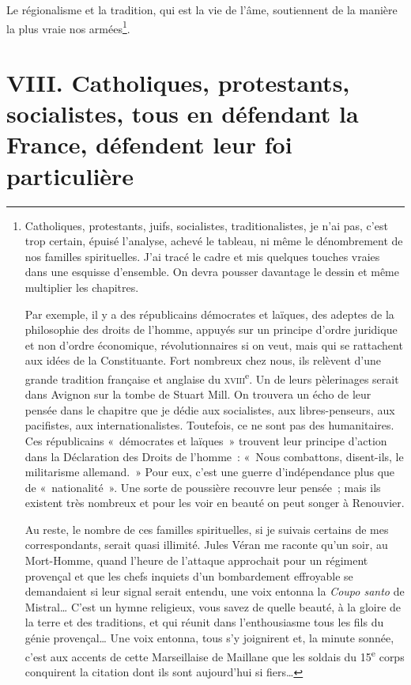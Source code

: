 \documentclass[french,twoside]{book} %
\newcommand\chapteropen{} %
\newcommand\chapterclose{} %
\begin{document}
Le régionalisme et la tradition, qui est la vie de l’âme, soutiennent de la manière la plus vraie nos armées\footnote{\noindent Catholiques, protestants, juifs, socialistes, traditionalistes, je n’ai pas, c’est trop certain, épuisé l’analyse, achevé le tableau, ni même le dénombrement de nos familles spirituelles. J’ai tracé le cadre et mis quelques touches vraies dans une esquisse d’ensemble. On devra pousser davantage le dessin et même multiplier les chapitres.‌\par
 Par exemple, il y a des républicains démocrates et laïques, des adeptes de la philosophie des droits de l’homme, appuyés sur un principe d’ordre juridique et non d’ordre économique, révolutionnaires si on veut, mais qui se rattachent aux idées de la Constituante. Fort nombreux chez nous, ils relèvent d’une grande tradition française et anglaise du \textsc{xviii}\textsuperscript{e}. Un de leurs pèlerinages serait dans Avignon sur la tombe de Stuart Mill. On trouvera un écho de leur pensée dans le chapitre que je dédie aux socialistes, aux libres-penseurs, aux pacifistes, aux internationalistes. Toutefois, ce ne sont pas des humanitaires. Ces républicains « démocrates et laïques » trouvent leur principe d’action dans la Déclaration des Droits de l’homme : « Nous combattons, disent-ils, le militarisme allemand. » Pour eux, c’est une guerre d’indépendance plus que de « nationalité ». Une sorte de poussière recouvre leur pensée ; mais ils existent très nombreux et pour les voir en beauté on peut songer à Renouvier.‌\par
 Au reste, le nombre de ces familles spirituelles, si je suivais certains de mes correspondants, serait quasi illimité. Jules Véran me raconte qu’un soir, au Mort-Homme, quand l’heure de l’attaque approchait pour un régiment provençal et que les chefs inquiets d’un bombardement effroyable se demandaient si leur signal serait entendu, une voix entonna la {\itshape Coupo santo} de Mistral… C’est un hymne religieux, vous savez de quelle beauté, à la gloire de la terre et des traditions, et qui réunit dans l’enthousiasme tous les fils du génie provençal… Une voix entonna, tous s’y joignirent et, la minute sonnée, c’est aux accents de cette Marseillaise de Maillane que les soldais du 15\textsuperscript{e} corps conquirent la citation dont ils sont aujourd’hui si fiers…
 }.‌
\chapterclose


\chapteropen
\chapter[VIII. Catholiques, protestants, socialistes, tous en défendant la France, défendent leur foi particulière]{VIII. Catholiques, protestants, socialistes, tous en défendant la France, défendent leur foi particulière}\renewcommand{\leftmark}{VIII. Catholiques, protestants, socialistes, tous en défendant la France, défendent leur foi particulière}
\end{document}
